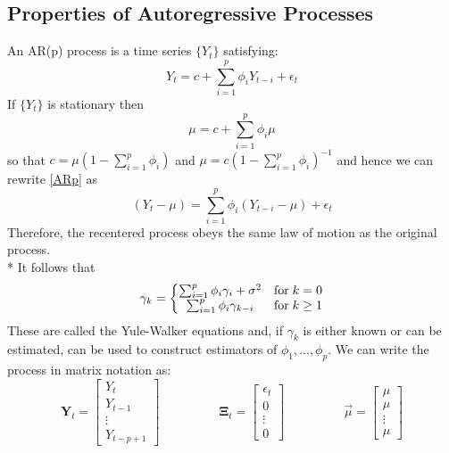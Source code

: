 \documentclass[11pt]{article}
\begin{document}
\subsection{Properties of Autoregressive Processes}
An AR(p) process is a time series $\{ Y_t \}$ satisfying:
\begin{equation} \label{ARp}
Y_t = c + \sum_{i=1}^p \phi_i Y_{t-i} + \epsilon_t
\end{equation}
If $\{ Y_t \}$ is stationary then $$\mu = c + \sum_{i=1}^p \phi_i \mu$$ so that $c = \mu \left( 1 - \sum_{i=1}^p \phi_i \right)$ and $\mu = c \left( 1 - \sum_{i=1}^p \phi_i \right)^{-1}$ and hence we can rewrite \eqref{ARp} as
\begin{equation}
\left( Y_t - \mu \right) = \sum_{i=1}^p \phi_i \left( Y_{t-i} - \mu \right) + \epsilon_t
\end{equation}
Therefore, the recentered process obeys the same law of motion as the original process.
\\*
It follows that
\begin{equation}
\gamma_k = \left\{\begin{matrix}
\sum_{i=1}^p \phi_i \gamma_{i} + \sigma^2 & \textup{for}\;k = 0 \\ 
\sum_{i=1}^p \phi_i \gamma_{k-i} & \textup{for}\;k \geq 1
\end{matrix}\right.
\end{equation}
These are called the Yule-Walker equations and, if $\gamma_k$ is either known or can be estimated, can be used to construct estimators of $\phi_1,...,\phi_p$.
We can write the process in matrix notation as:
\begin{equation}
\mathbf{Y}_t = \begin{bmatrix}
Y_t \\
Y_{t-1} \\
\vdots \\
Y_{t-p+1}
\end{bmatrix}
\;\;\;\;\;\;\;\;\;\;\;\;\;\;\;\;\;
\mathbf{\Xi}_t = \begin{bmatrix}
\epsilon_t \\
0 \\
\vdots \\
0
\end{bmatrix}
\;\;\;\;\;\;\;\;\;\;\;\;\;\;\;\;\;
\overrightarrow{\mu} = \begin{bmatrix}
\mu \\
\mu \\
\vdots \\
\mu
\end{bmatrix}
\end{equation}
\end{document}
